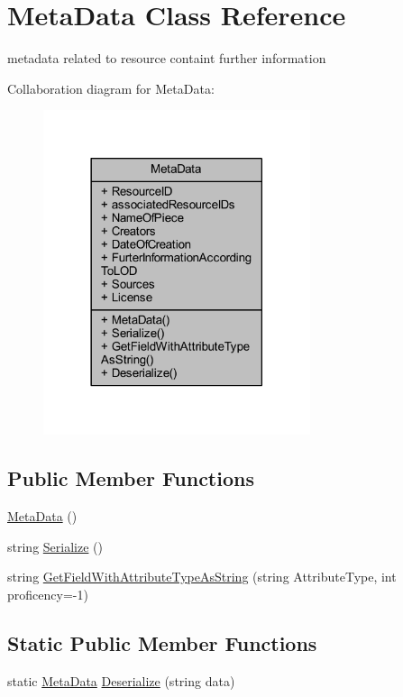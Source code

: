 \hypertarget{class_meta_data}{}\section{Meta\+Data Class Reference}
\label{class_meta_data}


metadata related to resource containt further information  




Collaboration diagram for Meta\+Data\+:
\nopagebreak
\begin{figure}[H]
\begin{center}
\leavevmode
\includegraphics[width=222pt]{class_meta_data__coll__graph}
\end{center}
\end{figure}
\subsection*{Public Member Functions}
\begin{DoxyCompactItemize}
\item 
\mbox{\hyperlink{class_meta_data_a51477d7066b8b3e42d41236f62ef5f36}{Meta\+Data}} ()
\item 
string \mbox{\hyperlink{class_meta_data_ad61836ec0caf65061ecdcd16c0ee6109}{Serialize}} ()
\item 
string \mbox{\hyperlink{class_meta_data_a6060e6297723e54b0df6c20defb57297}{Get\+Field\+With\+Attribute\+Type\+As\+String}} (string Attribute\+Type, int proficency=-\/1)
\end{DoxyCompactItemize}
\subsection*{Static Public Member Functions}
\begin{DoxyCompactItemize}
\item 
static \mbox{\hyperlink{class_meta_data}{Meta\+Data}} \mbox{\hyperlink{class_meta_data_adcfb4cc074566933e35c3f14451960ed}{Deserialize}} (string data)
\end{DoxyCompactItemize}

